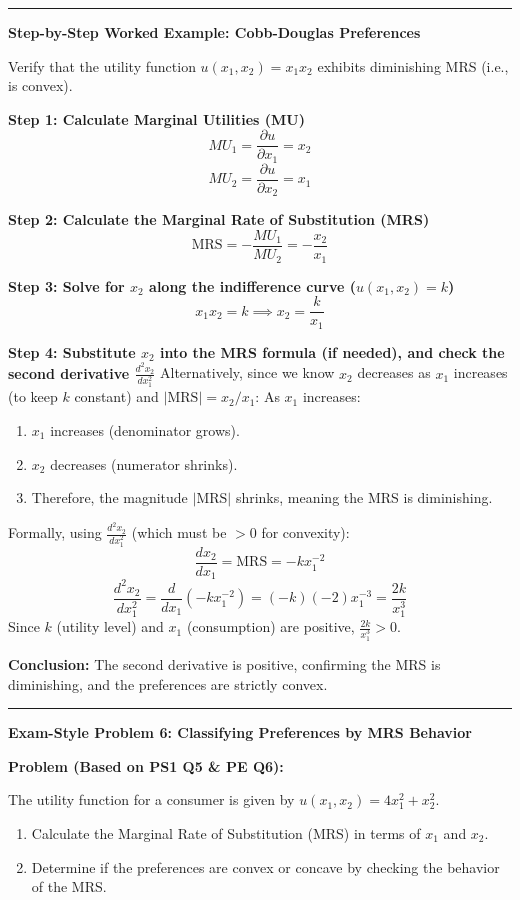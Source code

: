\documentclass{article}
\begin{document}
\hrule

\textbf{Step-by-Step Worked Example: Cobb-Douglas Preferences}

Verify that the utility function $u(x_1, x_2) = x_1 x_2$ exhibits diminishing MRS (i.e., is convex).

\textbf{Step 1: Calculate Marginal Utilities (MU)} $$ MU_1 = \frac{\partial u}{\partial x_1} = x_2 $$ $$ MU_2 = \frac{\partial u}{\partial x_2} = x_1 $$

\textbf{Step 2: Calculate the Marginal Rate of Substitution (MRS)} $$ \text{MRS} = -\frac{MU_1}{MU_2} = -\frac{x_2}{x_1} $$

\textbf{Step 3: Solve for $x_2$ along the indifference curve ($u(x_1, x_2) = k$)} $$ x_1 x_2 = k \implies x_2 = \frac{k}{x_1} $$

\textbf{Step 4: Substitute $x_2$ into the MRS formula (if needed), and check the second derivative $\frac{d^2x_2}{dx_1^2}$} Alternatively, since we know $x_2$ decreases as $x_1$ increases (to keep $k$ constant) and $|\text{MRS}| = x_2/x_1$: As $x_1$ increases:

\begin{enumerate}
    \item $x_1$ increases (denominator grows).
    \item $x_2$ decreases (numerator shrinks).
    \item Therefore, the magnitude $|\text{MRS}|$ shrinks, meaning the MRS is diminishing.
\end{enumerate}

Formally, using $\frac{d^2x_2}{dx_1^2}$ (which must be $> 0$ for convexity): $$ \frac{dx_2}{dx_1} = \text{MRS} = -k x_1^{-2} $$ $$ \frac{d^2x_2}{dx_1^2} = \frac{d}{dx_1}(-k x_1^{-2}) = (-k)(-2) x_1^{-3} = \frac{2k}{x_1^3} $$ Since $k$ (utility level) and $x_1$ (consumption) are positive, $\frac{2k}{x_1^3} > 0$.

\textbf{Conclusion:} The second derivative is positive, confirming the MRS is diminishing, and the preferences are strictly convex.

\hrule

\textbf{Exam-Style Problem 6: Classifying Preferences by MRS Behavior}

\textbf{Problem (Based on PS1 Q5 \& PE Q6):}

The utility function for a consumer is given by $u(x_1, x_2) = 4x_1^2 + x_2^2$.

\begin{enumerate}
    \item Calculate the Marginal Rate of Substitution (MRS) in terms of $x_1$ and $x_2$.
    \item Determine if the preferences are convex or concave by checking the behavior of the MRS.
\end{enumerate}
\end{document}
